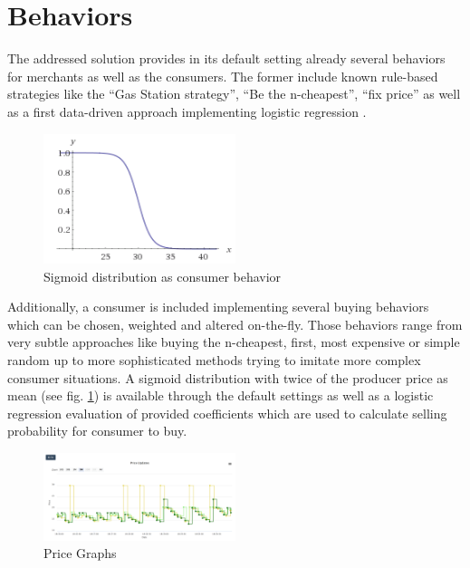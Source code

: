 \section{Behaviors}
\label{sec:Behaviors}
%
The addressed solution provides in its default setting already several behaviors for merchants as well as the consumers. The former include known rule-based strategies like the ``Gas Station strategy'', ``Be the n-cheapest'', ``fix price'' as well as a first data-driven approach implementing logistic regression \citep{hosmer2013applied}.
%
\begin{figure}[h]
    \centering
    \includegraphics[width=0.5\textwidth]{images/sigmoid.png}
    \caption{Sigmoid distribution as consumer behavior}
    \label{fig:sigmoid_distribution}
\end{figure}
%
Additionally, a consumer is included implementing several buying behaviors which can be chosen, weighted and altered on-the-fly. Those behaviors range from very subtle approaches like buying the n-cheapest, first, most expensive or simple random up to more sophisticated methods trying to imitate more complex consumer situations. A sigmoid distribution with twice of the producer price as mean (see fig. \ref{fig:sigmoid_distribution}) is available through the default settings as well as a logistic regression evaluation of provided coefficients which are used to calculate selling probability for consumer to buy.

%
\begin{figure}[h]
    \centering
    \includegraphics[width=0.5\textwidth]{images/price_graphs_v2.png}
    \caption{Price Graphs}
    \label{fig:price_graphs_v2}
\end{figure}
%